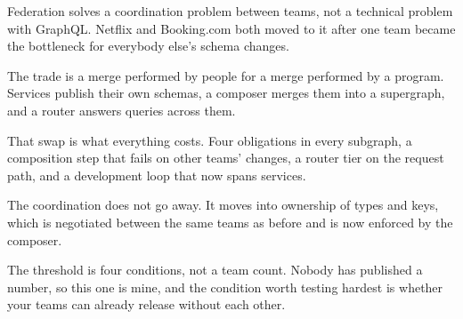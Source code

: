 \begin{chaptersummary}
  \item Federation solves a coordination problem between teams, not a
        technical problem with GraphQL. Netflix and Booking.com both moved to
        it after one team became the bottleneck for everybody else's schema
        changes.
  \item The trade is a merge performed by people for a merge performed by a
        program. Services publish their own schemas, a composer merges them
        into a supergraph, and a router answers queries across them.
  \item That swap is what everything costs. Four obligations in every
        subgraph, a composition step that fails on other teams' changes, a
        router tier on the request path, and a development loop that now spans
        services.
  \item The coordination does not go away. It moves into ownership of types
        and keys, which is negotiated between the same teams as before and is
        now enforced by the composer.
  \item The threshold is four conditions, not a team count. Nobody has
        published a number, so this one is mine, and the condition worth
        testing hardest is whether your teams can already release without each
        other.
\end{chaptersummary}
